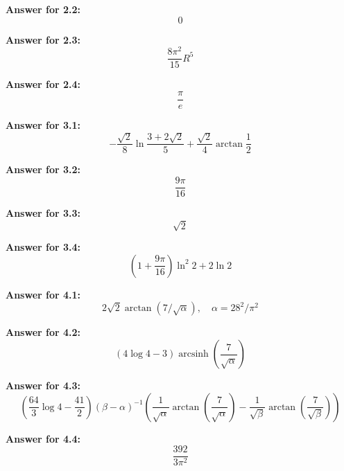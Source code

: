 \documentclass[12pt]{article}
\DeclareMathOperator{\arcsinh}{arcsinh}
\begin{document}
\par \textbf{Answer for 2.2: }
\begin{equation*}
    0
\end{equation*}

\par \textbf{Answer for 2.3: }
\begin{equation*}
    \frac{8\pi^2}{15}R^5
\end{equation*}

\par \textbf{Answer for 2.4: }
\begin{equation*}
    \frac{\pi}{e}
\end{equation*}


\par \textbf{Answer for 3.1: }
\begin{equation*}
    -\frac{\sqrt{2}}{8}\ln \frac{3+2\sqrt{2}}{5}+\frac{\sqrt{2}}{4}\arctan \frac{1}{2}
\end{equation*}

\par \textbf{Answer for 3.2: }
\begin{equation*}
    \frac{9\pi}{16}
\end{equation*}

\par \textbf{Answer for 3.3: }
\begin{equation*}
    \sqrt{2}
\end{equation*}

\par \textbf{Answer for 3.4: }
\begin{equation*}
    \left(1+\frac{9\pi}{16}\right)\ln^2 2 + 2\ln 2
\end{equation*}


\par \textbf{Answer for 4.1: }
\begin{equation*}
        2\sqrt{2}\arctan(7/\sqrt{\alpha}), \quad \alpha = 28^2/\pi^2
\end{equation*}

\par \textbf{Answer for 4.2: }
\begin{equation*}
    (4 \log 4 - 3)\arcsinh (\frac{7}{\sqrt{\alpha}})
\end{equation*}

\par \textbf{Answer for 4.3: }
\begin{equation*}
    (\frac{64}{3}\log4 - \frac{41}{2})(\beta - \alpha)^{-1}(\frac{1}{\sqrt{\alpha}} \arctan(\frac{7}{\sqrt{\alpha}}) - \frac{1}{\sqrt{\beta}} \arctan(\frac{7}{\sqrt{\beta}}))
\end{equation*}

\par \textbf{Answer for 4.4: }
\begin{equation*}
    \frac{392}{3\pi^2}
\end{equation*}
\end{document}
